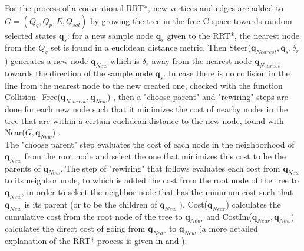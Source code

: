 \documentclass[letterpaper, 10 pt, conference]{ieeeconf}  %
\newcommand{\mb}[1]{{\boldsymbol{#1}}}
\begin{document}
For the process of a conventional RRT*, new vertices and edges are added to $G=(Q_q,Q_p,E,Q_{sol})$ by growing the tree in the free C-space towards random selected states $\mb{q}_s$: for a new sample node $\mb{q}_s$ given to the RRT*, the nearest node from the $Q_q$ set is found in a euclidean distance metric. Then {\selectfont Steer($\mb{q}_{Nearest},\mb{q}_s,\delta_r$) }  generates a new node $\mb{q}_{New}$ which is $\delta_r$ away from the nearest node $\mb{q}_{Nearest}$ towards the direction of the sample node $\mb{q}_s$. In case there is no collision in the line from the nearest node to the new created one, checked with the function {\selectfont Collision\_Free($\mb{q}_{Nearest}, \mb{q}_{New}$) }, then a "choose parent" and "rewiring" steps are done for each new node such that it minimizes the cost of nearby nodes in the tree that are within a certain euclidean distance to the new node, found with  {\selectfont Near($G,\mb{q}_{New}$) }.\\
The "choose parent" step evaluates the cost of each node in the neighborhood of $\mb{q}_{New}$ from the root node and select the one that minimizes this cost to be the parents of $\mb{q}_{New}$. The step of "rewiring" that follows evaluates each cost from $\mb{q}_{New}$  to its neighbor node, to which is added the cost from the root node of the tree to $\mb{q}_{New}$, in order to select the neighbor node that has the minimum cost such that $\mb{q}_{New}$ is its parent (or to be the children of $\mb{q}_{New}$ ). 
 {\selectfont Cost($\mb{q}_{Near}$) } calculates the cumulative cost from the root node of the tree to $\mb{q}_{Near}$ and {\selectfont CostIm($\mb{q}_{Near},\mb{q}_{New}$) } calculates the direct cost of going from $\mb{q}_{Near}$ to $\mb{q}_{New}$ (a more detailed explanation of the RRT* process is given in \cite{Karaman2011AnytimeMP} and \cite{KaramanRRTStar}).\\
 
\end{document}

